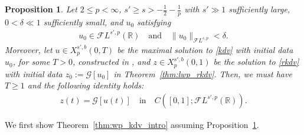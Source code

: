 \documentclass[a4paper,
11pt,  reqno]{amsart}
\newcommand{\5}{\textup{V}}
\newcommand{\FL}{\mathcal{F} L}
\newcommand{\dl}{\delta}
\newtheorem{proposition}[theorem]{Proposition}
\theoremstyle{remark}
\newcommand{\R}{\mathbb{R}}
\newcommand{\Gc}{\mathcal{G}}
\numberwithin{equation}{section}
\numberwithin{theorem}{section}
\begin{document}
\begin{proposition}\label{PRO:equiv}
Let $2 \le p < \infty$, $s' \ge s > - \frac12 - \frac1p$ with $s'\gg1$ sufficiently large, $0<\dl \ll 1$ sufficiently small, and $u_0$ satisfying
\begin{align}
\label{equiv-0}
u_0\in \FL^{s',p}(\R)
\quad
\text{and}
\quad
 \|u_0\|_{\FL^{s,p}}<\delta.
\end{align}
Moreover, let $u \in X^{s',b}_p(0,T)$ be the maximal solution to \eqref{kdv} with initial data $u_0$, for some $T>0$, constructed in
\cite{Grunrock_ldv_hier}, and $z\in X^{s', b}_p(0,1)$ be the solution to
\eqref{rkdv} with initial data $z_0 := \Gc[u_0]$ in Theorem~\ref{thm:lwp_rkdv}.
Then, we must have $T \ge 1$ and the following identity holds:
\begin{align} \label{equiv-1}
z(t)=\Gc[u(t)]
\quad
\text{in}
\quad
C([0,1]; \FL^{s',p}(\R)).
\end{align}


\end{proposition}

We first show Theorem~\ref{thm:wp_kdv_intro} assuming Proposition~\ref{PRO:equiv}.
\end{document}
